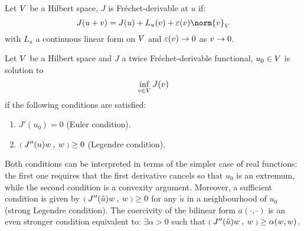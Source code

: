 \begin{dfntn}
Let ${V}$ be a Hilbert space, $J$ is Fréchet-derivable at $u$ if:
\begin{equation}\label{eq:directional_derivative}
J(u + v) =  J(u) + L_u(v) + \varepsilon(v) \norm{v}_\xV
\end{equation}
with $L_u$ a continuous linear form on ${V}$ and $\varepsilon(v)\rightarrow 0$ as $v \rightarrow 0$.
\end{dfntn}

\begin{prpstn}
Let ${V}$ be a Hilbert space and $J$ a twice Fréchet-derivable functional, $u_0 \in{V}$ is solution to
\begin{equation}\label{eq:minimization}
\inf_{v\in{V}} J(v)
\end{equation}
if the following conditions are satisfied:
\begin{enumerate}
\item $J'(u_0) = 0$ (Euler condition).
\item ${{\scriptstyle\mathbf{(}}\;J''(u)w\:,\: w \;{\scriptstyle\mathbf{)}}} \geq 0$ (Legendre condition).
\end{enumerate}
\end{prpstn}

Both conditions can be interpreted in terms of the simpler case of real functions: the first one requires that the first derivative cancels so that $u_0$ is an extremum, while the second condition is a convexity argument.
Moreover, a sufficient condition is given by ${{\scriptstyle\mathbf{(}}\;J''(\tilde u)w\:,\: w \;{\scriptstyle\mathbf{)}}} \geq 0$ for any $\tilde u$ in a neighbourhood of $u_0$ (strong Legendre condition).
The coercivity of the bilinear form $a(\cdot, \cdot)$ is an even stronger condition equivalent to: $\exists \alpha > 0$ such that ${{\scriptstyle\mathbf{(}}\;J''(\tilde u)w\:,\: w \;{\scriptstyle\mathbf{)}}} \geq \alpha (w,w)$.

